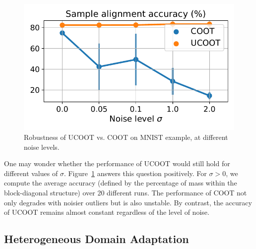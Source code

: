 \setlength{\intextsep}{0pt}
\begin{figure}
    \centering
    \vspace{-12pt}
    \includegraphics[width=\linewidth]{./Chapitre3/fig/mnist-sigma.pdf}
    \vspace*{-9mm}
    \caption{Robustness of UCOOT vs. COOT on MNIST example, at different noise levels.
    \label{f:mnist-sigma}}
\end{figure}
One may wonder whether the performance of UCOOT would still hold for different values of $\sigma$.
Figure~\ref{f:mnist-sigma} answers this question positively.
For $\sigma > 0$, we compute the average accuracy
(defined by the percentage of mass within the block-diagonal structure) over 20 different runs.
The performance of COOT not only degrades with noisier outliers but is also unstable.
By contrast, the accuracy of UCOOT remains almost constant regardless of the level of noise.

\subsection{Heterogeneous Domain Adaptation}

